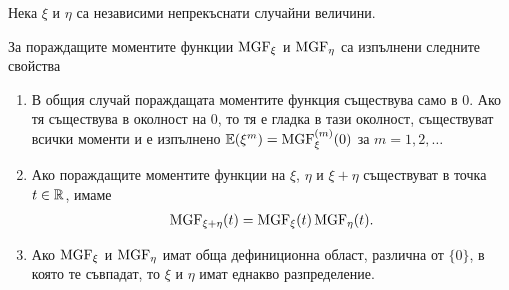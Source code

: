 \documentclass[numbers=endperiod, bibliography=totocnumbered]{scrartcl}
\begin{document}
\begin{theorem}\label{thm:mgf_properties}
  Нека \( \xi \) и \( \eta \) са независими непрекъснати случайни величини.

  За пораждащите моментите функции \( \operatorname{MGF}_\xi \) и \( \operatorname{MGF}_\eta \) са изпълнени следните свойства
  \begin{enumerate}
    \item В общия случай пораждащата моментите функция съществува само в \( 0 \). Ако тя съществува в околност на \( 0 \), то тя е гладка в тази околност, съществуват всички моменти и е изпълнено \( \mathbb{E}(\xi^m) = \operatorname{MGF}_\xi^{(m)} (0) \) за \( m = 1, 2, \ldots \)

    \item Ако пораждащите моментите функции на \( \xi \), \( \eta \) и \( \xi + \eta \) съществуват в точка \( t \in \mathbb{R} \), имаме
    \begin{align*}
      \operatorname{MGF}_{\xi + \eta}(t) = \operatorname{MGF}_\xi(t) \operatorname{MGF}_\eta(t).
    \end{align*}

    \item Ако \( \operatorname{MGF}_\xi \) и \( \operatorname{MGF}_\eta \) имат обща дефиниционна област, различна от \( \{ 0 \} \), в която те съвпадат, то \( \xi \) и \( \eta \) имат еднакво разпределение.
  \end{enumerate}
\end{theorem}
\end{document}
